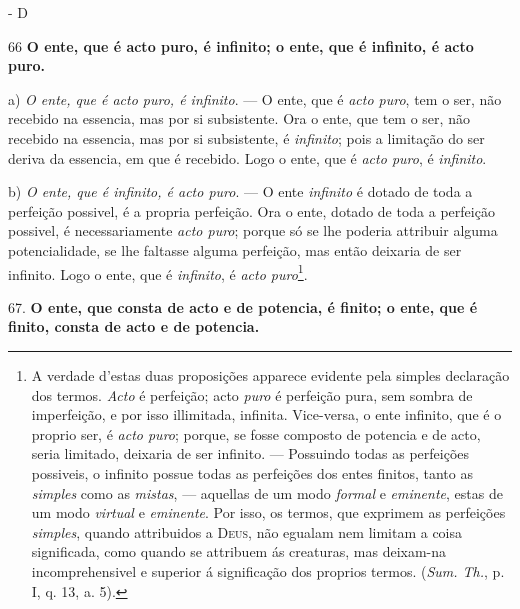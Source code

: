 - D


66 \textbf{O ente, que é acto puro, é infinito; o ente, que é infinito, é acto puro.}

a) \emph{O ente, que é acto puro, é infinito}. --- O ente, que é \emph{acto puro}, tem o ser, não recebido na essencia, mas por si subsistente. Ora o ente, que tem o ser, não recebido na essencia, mas por si subsistente, é \emph{infinito}; pois a limitação do ser deriva da essencia, em que é recebido. Logo o ente, que é \emph{acto puro}, é \emph{infinito}.

b) \emph{O ente, que é infinito, é acto puro}. --- O ente \emph{infinito} é dotado de toda a perfeição possivel, é a propria perfeição. Ora o ente, dotado de toda a perfeição possivel, é necessariamente \emph{acto puro}; porque só se lhe poderia attribuir alguma potencialidade, se lhe faltasse alguma perfeição, mas então deixaria de ser infinito. Logo o ente, que é \emph{infinito}, é \emph{acto puro}\footnote{A verdade d'estas duas proposições apparece evidente pela simples declaração dos termos. \emph{Acto} é perfeição; acto \emph{puro} é perfeição pura, sem sombra de imperfeição, e por isso illimitada, infinita. Vice-versa, o ente infinito, que é o proprio ser, é \emph{acto puro}; porque, se fosse composto de potencia e de acto, seria limitado, deixaria de ser infinito. --- Possuindo todas as perfeições possiveis, o infinito possue todas as perfeições dos entes finitos, tanto as \emph{simples} como as \emph{mistas}, --- aquellas de um modo \emph{formal} e \emph{eminente}, estas de um modo \emph{virtual} e \emph{eminente}. Por isso, os termos, que exprimem as perfeições \emph{simples}, quando attribuidos a \textsc{Deus}, não egualam nem limitam a coisa significada, como quando se attribuem ás creaturas, mas deixam-na incomprehensivel e superior á significação dos proprios termos. (\emph{Sum. Th.}, p. I, q. 13, a. 5).}.

67. \textbf{O ente, que consta de acto e de potencia, é finito; o ente, que é finito, consta de acto e de potencia.}

